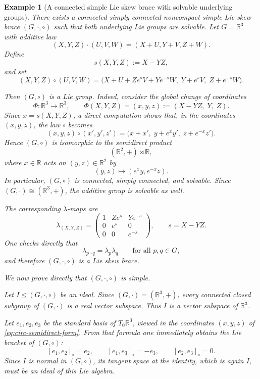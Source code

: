 \documentclass[reqno]{amsart}
\newtheorem{example}[theorem]{Example}
\newcommand{\R}{\mathbb R}
\begin{document}
\begin{example}[A connected simple Lie skew brace with solvable underlying groups]\label{ex:A1-1-model}\rm
There exists a connected simply connected noncompact simple Lie skew brace
\((G,\cdot,\circ)\) such that both underlying Lie groups are solvable.
Let \(G=\R^3\) with additive law
\[
(X,Y,Z)\cdot(U,V,W)=(X+U,Y+V,Z+W).
\]
Define
\[
s(X,Y,Z):=X-YZ,
\]
and set
\begin{equation}\label{eq:circ-simple-solvable}
(X,Y,Z)\circ(U,V,W)=
\Big(
X+U+Ze^{s}V+Ye^{-s}W,\;
Y+e^{s}V,\;
Z+e^{-s}W
\Big).
\end{equation}

Then \((G,\circ)\) is a Lie group. Indeed, consider the global change of
coordinates
\[
\Phi:\R^3\longrightarrow \R^3,
\qquad
\Phi(X,Y,Z)=(x,y,z):=(X-YZ,\;Y,\;Z).
\]
Since \(x=s(X,Y,Z)\), a direct computation shows that, in the coordinates
\((x,y,z)\), the law \(\circ\) becomes
\begin{equation}\label{eq:circ-semidirect-form}
(x,y,z)\circ(x',y',z')
=
\bigl(
x+x',\;
y+e^{x}y',\;
z+e^{-x}z'
\bigr).
\end{equation}
Hence \((G,\circ)\) is isomorphic to the semidirect product
\[
(\R^2,+)\rtimes \R,
\]
where \(x\in \R\) acts on \((y,z)\in \R^2\) by
\[
(y,z)\longmapsto (e^x y,e^{-x}z).
\]
In particular, \((G,\circ)\) is connected, simply connected, and solvable.
Since \((G,\cdot)\cong (\R^3,+)\), the additive group is solvable as well.

The corresponding \(\lambda\)-maps are
\[
\lambda_{(X,Y,Z)}=
\begin{pmatrix}
1 & Ze^{s} & Ye^{-s}\\
0 & e^{s} & 0\\
0 & 0 & e^{-s}
\end{pmatrix},
\qquad s=X-YZ.
\]
One checks directly that
\[
\lambda_{p\circ q}=\lambda_p\lambda_q
\qquad\text{for all }p,q\in G,
\]
and therefore \((G,\cdot,\circ)\) is a Lie skew brace.

We now prove directly that \((G,\cdot,\circ)\) is simple.

Let \(I\trianglelefteq (G,\cdot,\circ)\) be an ideal. Since
\((G,\cdot)=(\R^3,+)\), every connected closed subgroup of \((G,\cdot)\) is a
real vector subspace. Thus \(I\) is a vector subspace of \(\R^3\).

Let \(e_1,e_2,e_3\) be the standard basis of \(T_0\R^3\), viewed in the
coordinates \((x,y,z)\) of \eqref{eq:circ-semidirect-form}. From that formula
one immediately obtains the Lie bracket of \((G,\circ)\):
\[
[e_1,e_2]_{\circ}=e_2,\qquad
[e_1,e_3]_{\circ}=-e_3,\qquad
[e_2,e_3]_{\circ}=0.
\]
Since \(I\) is normal in \((G,\circ)\), its tangent space at the identity,
which is again \(I\), must be an ideal of this Lie algebra.


\end{example}
\end{document}
